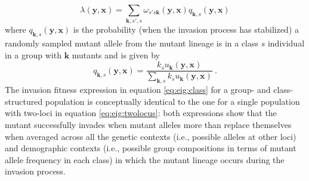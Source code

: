 \documentclass[11pt]{article}
\renewcommand{\vec}[1]{\symbf{#1}}
\newcommand{\eig}{\lambda}
\begin{document}
\begin{equation}
  \label{eq:eig:class}
  \eig(\vec{y}, \vec{x}) = \sum_{\vec{k},s'\!,s} \omega_{s'\!s\vec{k}}(\vec{y}, \vec{x}) q_{\vec{k},s}(\vec{y}, \vec{x})
\end{equation}
where $q_{\vec{k},s}(\vec{y}, \vec{x})$ is the probability (when the invasion process has stabilized) a randomly sampled mutant allele from the mutant lineage is in a class $s$ individual in a group with $\vec{k}$ mutants and is given by
\begin{equation*}
  q_{\vec{k},s}(\vec{y}, \vec{x}) = \frac{k_{s} u_{\vec{k}}(\vec{y}, \vec{x})}{\sum_{\vec{k},s} k_{s} u_{\vec{k}}(\vec{y}, \vec{x})} \: .
\end{equation*}
The invasion fitness expression in equation \eqref{eq:eig:class} for a group- and class-structured population is conceptually identical to the one for a single population with two-loci in equation \eqref{eq:eig:twolocus}: both expressions show that the mutant successfully invades when mutant alleles more than replace themselves when averaged across all the genetic contexts (i.e., possible alleles at other loci) and demographic contexts (i.e., possible group compositions in terms of mutant allele frequency in each class) in which the mutant lineage occurs during the invasion process.
\end{document}

